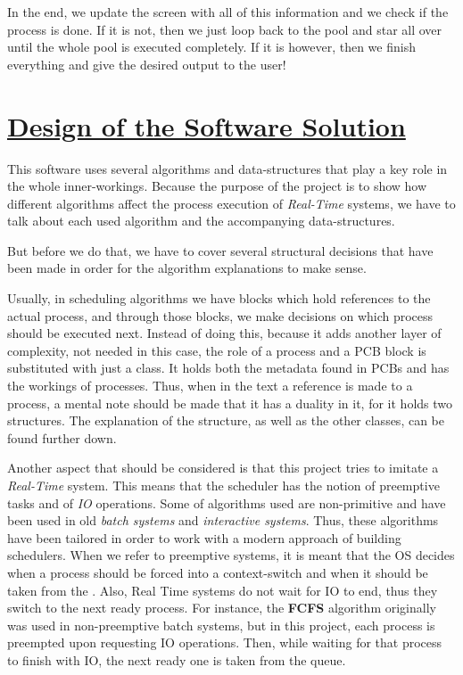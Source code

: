 \documentclass{article}
\newcommand{\code}[1]{\codeinline{\texttt{#1}}}
\begin{document}
In the end, we update the screen with all of this information and we check if the process is done. If it is not, then we just loop back to the pool and star all over until the whole pool is executed completely. If it is however, then we finish everything and give the desired output to the user!

\section{\underline{Design of the Software Solution}}

This software uses several algorithms and data-structures that play a key role in the whole inner-workings. Because the purpose of the project is to show how different algorithms affect the process execution of \textit{Real-Time} systems, we have to talk about each used algorithm and the accompanying data-structures.

But before we do that, we have to cover several structural decisions that have been made in order for the algorithm explanations to make sense.

Usually, in scheduling algorithms we have \code{PCB} blocks which hold references to the actual process, and through those blocks, we make decisions on which process should be executed next. Instead of doing this, because it adds another layer of complexity, not needed in this case, the role of a process and a PCB block is substituted with just a \code{process} class. It holds both the metadata found in PCBs and has the workings of processes. Thus, when in the text a reference is made to a process, a mental note should be made that it has a duality in it, for it holds two structures. The explanation of the \code{process} structure, as well as the other classes, can be found further down.

Another aspect that should be considered is that this project tries to imitate a \textit{Real-Time} system. This means that the scheduler has the notion of preemptive tasks and of \textit{IO} operations. Some of algorithms used are non-primitive and have been used in old \textit{batch systems} and \textit{interactive systems}. Thus, these algorithms have been tailored in order to work with a modern approach of building schedulers. When we refer to preemptive systems, it is meant that the OS decides when a process should be forced into a context-switch and when it should be taken from the \code{ready\_queue}. Also, Real Time systems do not wait for IO to end, thus they switch to the next ready process. For instance, the \textbf{FCFS} algorithm originally was used in non-preemptive batch systems, but in this project, each process is preempted upon requesting IO operations. Then, while waiting for that process to finish with IO, the next ready one is taken from the queue.
\end{document}

